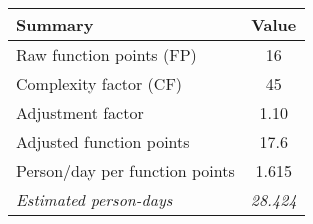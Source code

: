 \begin{tabular}{l|c}
\textbf{Summary} & \textbf{Value} \\ \hline
Raw function points (FP) & 16 \\
Complexity factor (CF) & 45 \\
Adjustment factor & 1.10 \\
Adjusted function points & 17.6 \\
Person/day per function points & 1.615 \\ \hline
\textit{Estimated person-days} & \textit{28.424}
\end{tabular}
